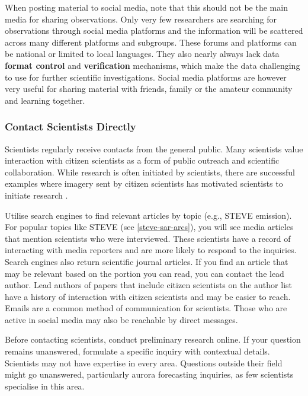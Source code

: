 \documentclass{article}
\renewcommand{\cite}[1]{\parencite{#1}}
\begin{document}
When posting material to social media, note that this should not be the main media for sharing observations. Only very few researchers are searching for observations through social media platforms and the information will be scattered across many different platforms and subgroups. These forums and platforms can be national or limited to local languages. They also nearly always lack data \textbf{format control} and \textbf{verification} mechanisms, which make the data challenging to use for further scientific investigations. Social media platforms are however very useful for sharing material with friends, family or the amateur community and learning together. 



\subsubsection{Contact Scientists Directly}

Scientists regularly receive contacts from the general public. Many scientists value interaction with citizen scientists as a form of public outreach and scientific collaboration. While research is often initiated by scientists, there are successful examples where imagery sent by citizen scientists has motivated scientists to initiate research \cite{MacDonald2018,Nishimura2022,Nishimura2023,Palmroth2020}. 

Utilise search engines to find relevant articles by topic (e.g., STEVE emission). For popular topics like STEVE (see \ref{steve-sar-arcs}), you will see media articles that mention scientists who were interviewed. These scientists have a record of interacting with media reporters and are more likely to respond to the inquiries. Search engines also return scientific journal articles. If you find an article that may be relevant based on the portion you can read, you can contact the lead author. Lead authors of papers that include citizen scientists on the author list have a history of interaction with citizen scientists and may be easier to reach. Emails are a common method of communication for scientists. Those who are active in social media may also be reachable by direct messages. 

Before contacting scientists, conduct preliminary research online. If your question remains unanswered, formulate a specific inquiry with contextual details. Scientists may not have expertise in every area. Questions outside their field might go unanswered, particularly aurora forecasting inquiries, as few scientists specialise in this area. 
\end{document}
